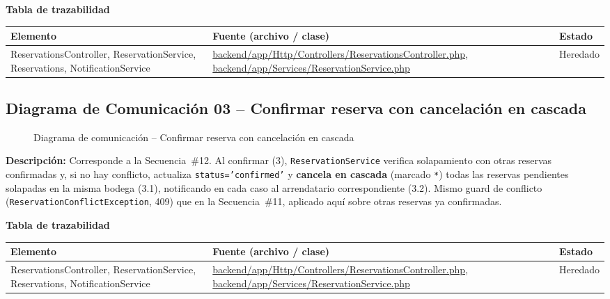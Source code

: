 \bigskip
\noindent\textbf{Tabla de trazabilidad}
\begin{longtable}{|L{5cm}|L{7.5cm}|M{2cm}|}
\hline
{} \textbf{Elemento} & \textbf{Fuente (archivo / clase)} & \textbf{Estado} \\ \hline
\endhead
ReservationsController, ReservationService, Reservations, NotificationService & \url{backend/app/Http/Controllers/ReservationsController.php}, \url{backend/app/Services/ReservationService.php} & Heredado \\ \hline
\end{longtable}
\clearpage

\subsection{Diagrama de Comunicación 03 -- Confirmar reserva con cancelación en cascada}
\begin{figure}[H]
    \centering
    \caption{Diagrama de comunicación -- Confirmar reserva con cancelación en cascada}
    \label{fig:com03}
\end{figure}
{\sloppy\noindent\textbf{Descripción:} Corresponde a la Secuencia~\#12. Al confirmar (3), \texttt{ReservationService} verifica solapamiento con otras reservas confirmadas y, si no hay conflicto, actualiza \texttt{status='confirmed'} y \textbf{cancela en cascada} (marcado \texttt{*}) todas las reservas pendientes solapadas en la misma bodega (3.1), notificando en cada caso al arrendatario correspondiente (3.2). Mismo guard de conflicto (\texttt{ReservationConflictException}, 409) que en la Secuencia~\#11, aplicado aquí sobre otras reservas ya confirmadas.\par}

\bigskip
\noindent\textbf{Tabla de trazabilidad}
\begin{longtable}{|L{5cm}|L{7.5cm}|M{2cm}|}
\hline
{} \textbf{Elemento} & \textbf{Fuente (archivo / clase)} & \textbf{Estado} \\ \hline
\endhead
ReservationsController, ReservationService, Reservations, NotificationService & \url{backend/app/Http/Controllers/ReservationsController.php}, \url{backend/app/Services/ReservationService.php} & Heredado \\ \hline
\end{longtable}
\clearpage

